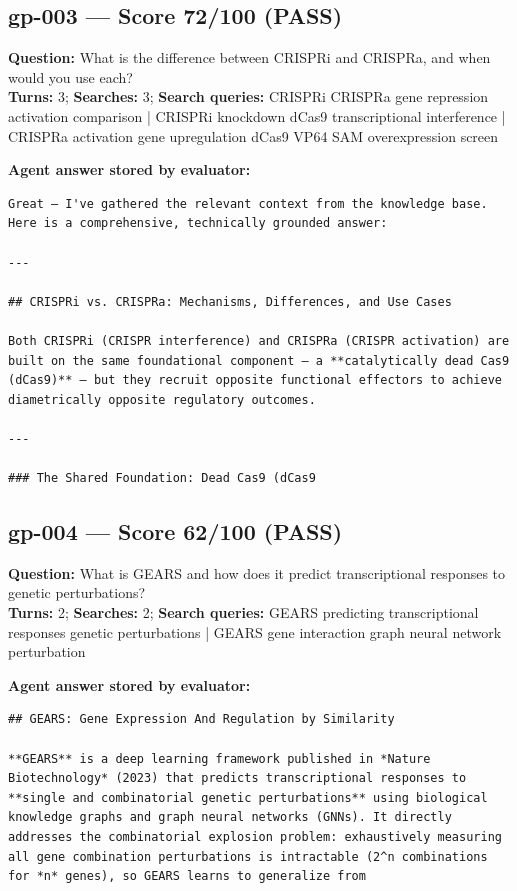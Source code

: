 \documentclass[12pt, a4paper]{article}
\begin{document}
\subsection*{gp-003 --- Score 72/100 (PASS)}
\noindent\textbf{Question:} What is the difference between CRISPRi and CRISPRa, and when would you use each?\\
\textbf{Turns:} 3; \textbf{Searches:} 3; \textbf{Search queries:} CRISPRi CRISPRa gene repression activation comparison | CRISPRi knockdown dCas9 transcriptional interference | CRISPRa activation gene upregulation dCas9 VP64 SAM overexpression screen

\noindent\textbf{Agent answer stored by evaluator:}
\begin{lstlisting}[numbers=none]
Great — I've gathered the relevant context from the knowledge base. Here is a comprehensive, technically grounded answer:

---

## CRISPRi vs. CRISPRa: Mechanisms, Differences, and Use Cases

Both CRISPRi (CRISPR interference) and CRISPRa (CRISPR activation) are built on the same foundational component — a **catalytically dead Cas9 (dCas9)** — but they recruit opposite functional effectors to achieve diametrically opposite regulatory outcomes.

---

### The Shared Foundation: Dead Cas9 (dCas9
\end{lstlisting}

\subsection*{gp-004 --- Score 62/100 (PASS)}
\noindent\textbf{Question:} What is GEARS and how does it predict transcriptional responses to genetic perturbations?\\
\textbf{Turns:} 2; \textbf{Searches:} 2; \textbf{Search queries:} GEARS predicting transcriptional responses genetic perturbations | GEARS gene interaction graph neural network perturbation

\noindent\textbf{Agent answer stored by evaluator:}
\begin{lstlisting}[numbers=none]
## GEARS: Gene Expression And Regulation by Similarity

**GEARS** is a deep learning framework published in *Nature Biotechnology* (2023) that predicts transcriptional responses to **single and combinatorial genetic perturbations** using biological knowledge graphs and graph neural networks (GNNs). It directly addresses the combinatorial explosion problem: exhaustively measuring all gene combination perturbations is intractable (2^n combinations for *n* genes), so GEARS learns to generalize from 
\end{lstlisting}
\end{document}
